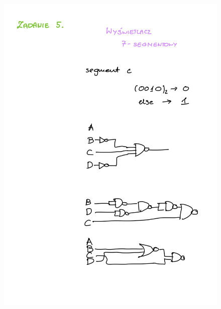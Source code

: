 \documentclass[14pt, table]{extarticle}
\begin{document}
\begin{figure}[H]
\includegraphics[scale=0.2]{B5}
\centering
\captionsetup{labelformat=empty}
\caption{}
\end{figure}
\end{document}
